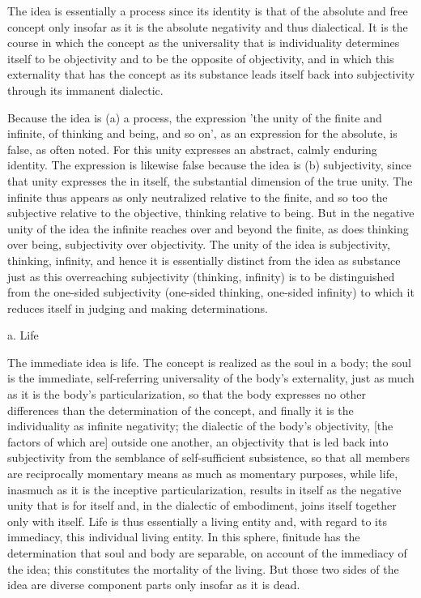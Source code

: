 The idea is essentially a process since its identity is
that of the absolute and free concept only insofar as
it is the absolute negativity and thus dialectical.
It is the course in which the concept
as the universality that is individuality
determines itself to be objectivity
and to be the opposite of objectivity,
and in which this externality
that has the concept as its substance leads
itself back into subjectivity
through its immanent dialectic.

Because the idea is (a) a process, the expression
'the unity of the finite and infinite,
of thinking and being, and so on',
as an expression for the absolute,
is false, as often noted.
For this unity expresses
an abstract, calmly enduring identity.
The expression is likewise false
because the idea is (b) subjectivity,
since that unity expresses the in itself,
the substantial dimension of the true unity.
The infinite thus appears as only
neutralized relative to the finite,
and so too the subjective relative to the objective,
thinking relative to being.
But in the negative unity of the idea
the infinite reaches over and beyond the finite,
as does thinking over being,
subjectivity over objectivity.
The unity of the idea is
subjectivity, thinking, infinity,
and hence it is essentially distinct
from the idea as substance
just as this overreaching subjectivity (thinking, infinity)
is to be distinguished from the one-sided subjectivity
(one-sided thinking, one-sided infinity)
to which it reduces itself in
judging and making determinations.

a. Life

The immediate idea is life.
The concept is realized as the soul in a body;
the soul is the immediate, self-referring
universality of the body's externality,
just as much as it is the body's particularization,
so that the body expresses no other differences
than the determination of the concept,
and finally it is the individuality as infinite negativity;
the dialectic of the body's objectivity,
[the factors of which are] outside one another,
an objectivity that is led back into subjectivity
from the semblance of self-sufficient subsistence,
so that all members are reciprocally momentary means
as much as momentary purposes,
while life, inasmuch as it is the inceptive particularization,
results in itself as the negative unity that is for itself
and, in the dialectic of embodiment,
joins itself together only with itself.
Life is thus essentially a living entity
and, with regard to its immediacy,
this individual living entity.
In this sphere, finitude has the determination
that soul and body are separable,
on account of the immediacy of the idea;
this constitutes the mortality of the living.
But those two sides of the idea are diverse component parts
only insofar as it is dead.

